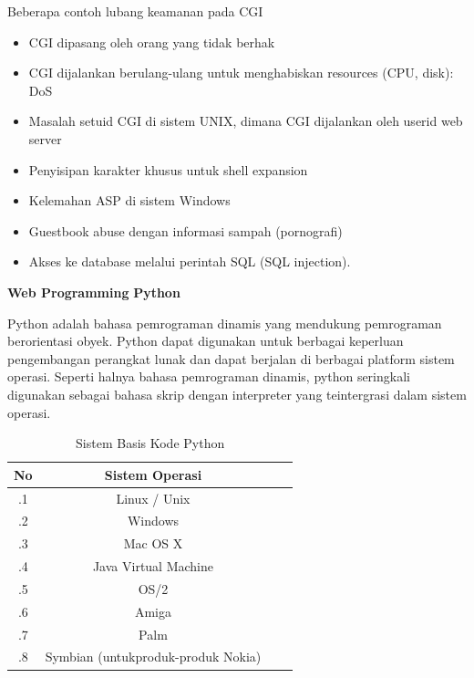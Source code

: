 \noindent 
Beberapa contoh lubang keamanan pada CGI \par
\noindent 
\begin{itemize}
	\item CGI dipasang oleh orang yang tidak berhak \par
	\noindent 
	\item CGI dijalankan berulang-ulang untuk menghabiskan resources (CPU, disk): DoS \par
	\noindent 
	\item Masalah setuid CGI di sistem UNIX, dimana CGI dijalankan oleh userid web server \par
	\noindent 
	\item Penyisipan karakter khusus untuk shell expansion \par
	\noindent 
	\item Kelemahan ASP di sistem Windows \par
	\noindent 
	\item Guestbook abuse dengan informasi sampah (pornografi) \par
	\noindent 
	\item Akses ke database melalui perintah SQL (SQL injection).\end{itemize}
\par
\vspace{12pt}
\noindent 
\textbf{Web Programming }\textbf{Python} \par
Python adalah bahasa pemrograman dinamis yang mendukung pemrograman berorientasi obyek. Python dapat digunakan untuk berbagai keperluan pengembangan perangkat lunak dan dapat berjalan di berbagai platform sistem operasi. Seperti halnya bahasa pemrograman dinamis, python seringkali digunakan sebagai bahasa skrip dengan interpreter yang teintergrasi dalam sistem operasi.

\begin{table}[ht]
	\caption{Sistem Basis Kode Python}
	\centering
	\begin{tabular}{cccc}
		\hline
		No&Sistem Operasi&\\
		\hline
		.1&Linux / Unix&\\
		.2&Windows&\\
		.3&Mac OS X&\\
		.4&Java Virtual Machine&\\
		.5&OS/2&\\
		.6&Amiga&\\
		.7&Palm&\\
		.8&Symbian (untukproduk-produk Nokia)&\\
		\hline
	\end{tabular}
\end{table}

